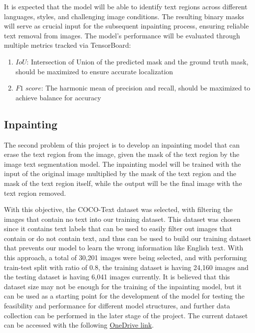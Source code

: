 \documentclass[10pt,twocolumn,letterpaper]{article}
\begin{document}
It is expected that the model will be able to identify text regions across different languages, styles, and challenging image conditions. 
The resulting binary masks will serve as crucial input for the subsequent inpainting process, ensuring reliable text removal from images. 
The model's performance will be evaluated through multiple metrics tracked via TensorBoard:
\begin{enumerate}
    \item $IoU$: Intersection of Union of the predicted mask and the ground truth mask, should be maximized to ensure accurate localization
    \item $F1\;score$: The harmonic mean of precision and recall, should be maximized to achieve balance for accuracy 
\end{enumerate}

\subsection{Inpainting}

The second problem of this project is to develop an inpainting model that can erase the text region from the image, given the mask of the text region by 
the image text segmentation model. The inpainting model will be trained with the input of the original image multiplied by the mask of the text region and 
the mask of the text region itself, while the output will be the final image with the text region removed.

With this objective, the COCO-Text dataset was selected, with filtering the images that contain no text into our training dataset. This dataset was 
chosen since it contains text labels that can be used to easily filter out images that contain or do not contain text, and thus can be used to build our training 
dataset that prevents our model to learn the wrong information like English text. With this approach, a total of 30,201 images were being selected, and with 
performing train-test split with ratio of 0.8, the training dataset is having 24,160 images and the testing dataset is having 6,041 images currently. It is believed
that this dataset size may not be enough for the training of the inpainting model, but it can be used as a starting point for the development of the model for testing
the feasibility and performance for different model structures, and further data collection can be performed in the later stage of the project. The current dataset can
be accessed with the following 
\href{https://hkustconnect-my.sharepoint.com/:u:/g/personal/tkleungal_connect_ust_hk/EUJ-38d8cptNgW2RK0JzHI4BfIi5mXwbIEFObTG7ji9f8g?e=LqJ1Eu}{OneDrive link}.
\end{document}
